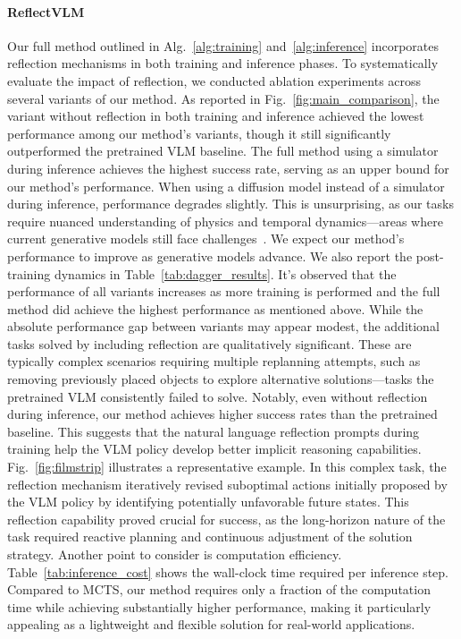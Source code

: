 \paragraph{ReflectVLM} Our full method outlined in Alg.~\ref{alg:training} and~\ref{alg:inference} incorporates reflection mechanisms in both training and inference phases. To systematically evaluate the impact of reflection, we conducted ablation experiments across several variants of our method.
As reported in Fig.~\ref{fig:main_comparison}, the variant without reflection in both training and inference achieved the lowest performance among our method's variants, though it still significantly outperformed the pretrained VLM baseline. The full method using a simulator during inference achieves the highest success rate, serving as an upper bound for our method's performance. When using a diffusion model instead of a simulator during inference, performance degrades slightly. This is unsurprising, as our tasks require nuanced understanding of physics and temporal dynamics—areas where current generative models still face challenges~\citep{kang2024farvideogenerationworld, motamed2025generativevideomodelslearn}. We expect our method's performance to improve as generative models advance.
We also report the post-training dynamics in Table~\ref{tab:dagger_results}. It's observed that the performance of all variants increases as more training is performed and the full method did achieve the highest performance as mentioned above.
While the absolute performance gap between variants may appear modest, the additional tasks solved by including reflection are qualitatively significant. These are typically complex scenarios requiring multiple replanning attempts, such as removing previously placed objects to explore alternative solutions—tasks the pretrained VLM consistently failed to solve. Notably, even without reflection during inference, our method achieves higher success rates than the pretrained baseline. This suggests that the natural language reflection prompts during training help the VLM policy develop better implicit reasoning capabilities. 
Fig.~\ref{fig:filmstrip} illustrates a representative example. In this complex task, the reflection mechanism iteratively revised suboptimal actions initially proposed by the VLM policy by identifying potentially unfavorable future states. This reflection capability proved crucial for success, as the long-horizon nature of the task required reactive planning and continuous adjustment of the solution strategy. 
Another point to consider is computation efficiency. Table~\ref{tab:inference_cost} shows the wall-clock time required per inference step. Compared to MCTS, our method requires only a fraction of the computation time while achieving substantially higher performance, making it particularly appealing as a lightweight and flexible solution for real-world applications.

